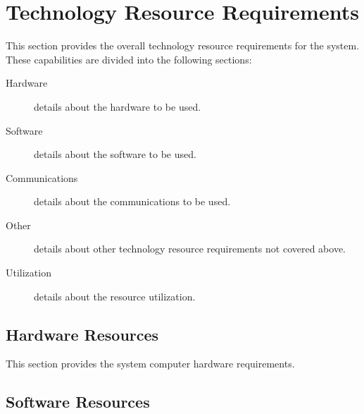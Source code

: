 \KNEADSECTIONNEWPAGE
\section{Technology Resource Requirements}
\label{lab:sec_TechnologyResourceRequirements}


This section provides the overall technology resource requirements for the system. 
These capabilities are divided into the following sections:
\begin{description}
	\item[Hardware] details about the hardware to be used. 
	\item[Software] details about the software to be used.
	\item[Communications] details about the communications to be used.
	\item[Other] details about other technology resource requirements not covered above.
	\item[Utilization] details about the resource utilization.
\end{description}

\KNEADSUBSECTIONNEWPAGE
\subsection{Hardware Resources}
\label{lab:ssec_TechnologyResourceHardware}


This section provides the system computer hardware requirements.

%


\KNEADSUBSECTIONNEWPAGE
\subsection{Software Resources}
\label{lab:ssec_TechnologyResourceSoftware}


